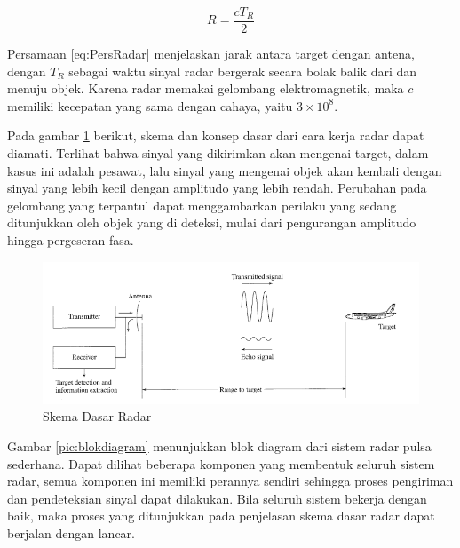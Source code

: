 \begin{equation}
	R = \frac{cT_{R}}{2}
	\label{eq:PersRadar}
\end{equation}

Persamaan \ref{eq:PersRadar} menjelaskan jarak antara target dengan antena, dengan $T_{R}$ sebagai waktu sinyal radar bergerak secara bolak balik dari dan menuju objek. Karena radar memakai gelombang elektromagnetik, maka $c$ memiliki kecepatan yang sama dengan cahaya, yaitu $3 \times 10 ^{8}$.

Pada gambar \ref{pic:skemaRadar} berikut, skema dan konsep dasar dari cara kerja radar dapat diamati. Terlihat bahwa sinyal yang dikirimkan akan mengenai target, dalam kasus ini adalah pesawat, lalu sinyal yang mengenai objek akan kembali dengan sinyal yang lebih kecil dengan amplitudo yang lebih rendah. Perubahan pada gelombang yang terpantul dapat menggambarkan perilaku yang sedang ditunjukkan oleh objek yang di deteksi, mulai dari pengurangan amplitudo hingga pergeseran fasa.

 \begin{figure}
	\begin{center}
		\includegraphics[scale=0.5]{pics/bab2/skemaradar.png} 
		\caption[Skema Dasar Radar]{{Skema Dasar Radar} \cite{Skolnik2001}}
		\label{pic:skemaRadar}
	\end{center}
\end{figure}

Gambar \ref{pic:blokdiagram} menunjukkan blok diagram dari sistem radar pulsa sederhana. Dapat dilihat beberapa komponen yang membentuk seluruh sistem radar, semua komponen ini memiliki perannya sendiri sehingga proses pengiriman dan pendeteksian sinyal dapat dilakukan.  Bila seluruh sistem bekerja dengan baik, maka proses yang ditunjukkan pada penjelasan skema dasar radar dapat berjalan dengan lancar.

